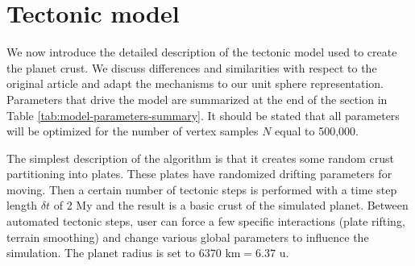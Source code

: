 \section{Tectonic model}
\label{sec:tectonicmodel}
We now introduce the detailed description of the tectonic model used to create the planet crust. We discuss differences and similarities with respect to the original article and adapt the mechanisms to our unit sphere representation. Parameters that drive the model are summarized at the end of the section in Table \ref{tab:model-parameters-summary}. It should be stated that all parameters will be optimized for the number of vertex samples $N$ equal to 500,000.

The simplest description of the algorithm is that it creates some random crust partitioning into plates. These plates have randomized drifting parameters for moving. Then a certain number of tectonic steps is performed with a time step length $\delta t$ of 2 My and the result is a basic crust of the simulated planet. Between automated tectonic steps, user can force a few specific interactions (plate rifting, terrain smoothing) and change various global parameters to influence the simulation. The planet radius is set to $6370\mbox{ km}=6.37\mbox{ u}$.
